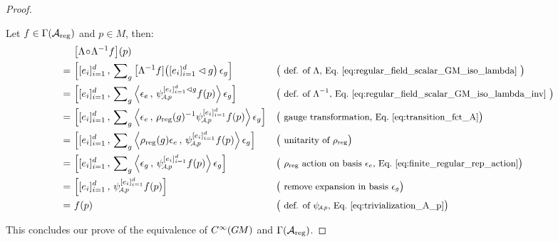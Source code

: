 \begin{proof}
\begin{itemize}[leftmargin=1.1cm]
            Let $f\in\Gamma(\mathcal{A}_{\textup{reg}})$ and $p\in M$, then:
            \begin{align}
                &\ \big[\Lambda \!\circ\! \Lambda^{-1} f \big] (p) \notag \\
                \ =&\ \Big[ [e_i]_{i=1}^d \,,\, \sum\nolimits_g \big[\Lambda^{-1}f]\big( [e_i]_{i=1}^d\lhd g\big)\, \epsilon_g \Big]
                    && \big( \text{\small def. of $\Lambda$, Eq.~\eqref{eq:regular_field_scalar_GM_iso_lambda} } \big) \notag\\
                \ =&\ \Big[ [e_i]_{i=1}^d \,,\, \sum\nolimits_g \Big\langle \epsilon_e \,,\, \psiAp^{[e_i]_{i=1}^d\lhd g} f(p) \Big\rangle\, \epsilon_g \Big]
                    && \big( \text{\small def. of $\Lambda^{-1}$, Eq.~\eqref{eq:regular_field_scalar_GM_iso_lambda_inv} } \big) \notag\\
                \ =&\ \Big[ [e_i]_{i=1}^d \,,\, \sum\nolimits_g \Big\langle \epsilon_e \,,\, \rho_{\textup{reg}}(g)^{-1} \psiAp^{[e_i]_{i=1}^d} f(p) \Big\rangle\, \epsilon_g \Big]
                    && \big( \text{\small gauge transformation, Eq.~\eqref{eq:transition_fct_A}} \big) \notag\\
                \ =&\ \Big[ [e_i]_{i=1}^d \,,\, \sum\nolimits_g \Big\langle \rho_{\textup{reg}}(g) \epsilon_e \,,\, \psiAp^{[e_i]_{i=1}^d} f(p) \Big\rangle\, \epsilon_g \Big]
                    && \big( \text{\small unitarity of $\rho_{\textup{reg}}$} \big) \notag\\
                \ =&\ \Big[ [e_i]_{i=1}^d \,,\, \sum\nolimits_g \Big\langle \epsilon_g \,,\, \psiAp^{[e_i]_{i=1}^d} f(p) \Big\rangle\, \epsilon_g \Big]
                    && \big( \text{\small $\rho_{\textup{reg}}$ action on basis $\epsilon_e$, Eq.~\eqref{eq:finite_regular_rep_action}} \big) \notag\\
                \ =&\ \Big[ [e_i]_{i=1}^d \,,\, \psiAp^{[e_i]_{i=1}^d} f(p) \Big]
                    && \big( \text{\small remove expansion in basis $\epsilon_g$} \big) \notag\\
                \ =&\ f(p)
                    && \big( \text{\small def. of $\psiAp$, Eq.~\eqref{eq:trivialization_A_p}} \big)
            \end{align}

    \end{itemize}

    This concludes our prove of the equivalence of $C^\infty(G\mkern-1.4muM)$ and $\Gamma(\mathcal{A}_\textup{reg})$.
\end{proof}
